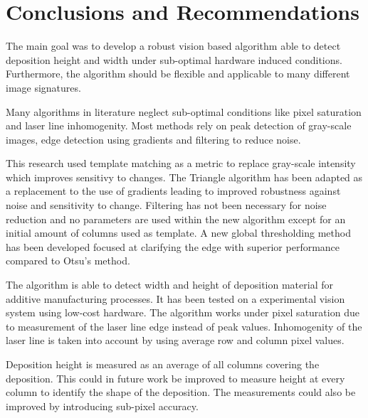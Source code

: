 
\chapter{Conclusions and Recommendations}\label{ch:conclusions} 

The main goal was to develop a robust vision based algorithm able to detect deposition height and width under sub-optimal hardware induced conditions. Furthermore, the algorithm should be flexible and applicable to many different image signatures.  

Many algorithms in literature neglect sub-optimal conditions like pixel saturation and laser line inhomogenity. Most methods rely on peak detection of gray-scale images, edge detection using gradients and filtering to reduce noise.  

This research used template matching as a metric to replace gray-scale intensity which improves sensitivy to changes. The Triangle algorithm has been adapted as a replacement to the use of gradients leading to improved robustness against noise and sensitivity to change. Filtering has not been necessary for noise reduction and no parameters are used within the new algorithm except for an initial amount of columns used as template. A new global thresholding method has been developed focused at clarifying the edge with superior performance compared to Otsu's method. 

The algorithm is able to detect width and height of deposition material for additive manufacturing processes. It has been tested on a experimental vision system using low-cost hardware. The algorithm works under pixel saturation due to measurement of the laser line edge instead of peak values. Inhomogenity of the laser line is taken into account by using average row and column pixel values. 

\skippar
Deposition height is measured as an average of all columns covering the deposition. This could in future work be improved to measure height at every column to identify the shape of the deposition. The measurements could also be improved by introducing sub-pixel accuracy. 
